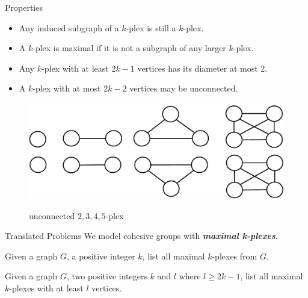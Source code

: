 \documentclass[9pt]{beamer} %
\begin{document}
\begin{frame}{Properties}
    \begin{lemma}
        \begin{itemize}
            \item Any induced subgraph of a $k$-plex is still a $k$-plex.
            \item A $k$-plex is maximal if it is not a subgraph of any larger $k$-plex.
        \end{itemize}
    \end{lemma}
    \begin{lemma}
        \begin{itemize}
            \item Any $k$-plex with at least $2k-1$ vertices has its diameter at most 2.
            \item A $k$-plex with at most $2k-2$ vertices may be unconnected.
        \end{itemize}
    \end{lemma}
    \begin{figure}[h]
        \centering
        \includegraphics[width=0.5\linewidth]{pic/unconnected.pdf}\\
        \caption{unconnected $2,3,4,5$-plex}
    \end{figure}
\end{frame}
\begin{frame}{Translated Problems}
    We model cohesive groups with \textbf{\emph{maximal k-plexes}}.
    
    \begin{problem}
        Given a graph $G$, a positive integer $k$, list all maximal $k$-plexes from $G$.
    \end{problem}
    \begin{problem}
        Given a graph $G$, two positive integers $k$ and $l$ where $l \ge 2k-1$, list all maximal $k$-plexes with at least $l$ vertices.
    \end{problem}

\end{frame}
\end{document}
